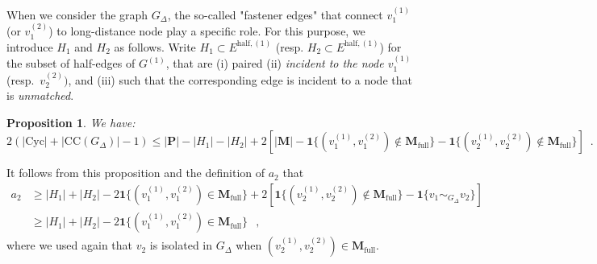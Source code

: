 \documentclass{article}
\newtheorem{proposition}{Proposition}
\begin{document}

\medskip 

When we consider the graph $G_{\Delta}$, the so-called "fastener edges" that connect $v_1^{(1)}$ (or $v_1^{(2)}$) to long-distance node play a specific role. For this purpose, we introduce $H_1$ and $H_2$ as follows.  
 Write $H_1\subset E^{\mathrm{half},(1)}$ (resp. $H_2\subset E^{\mathrm{half},(1)}$) for the subset of half-edges of $G^{(1)}$, that are (i) paired (ii) \emph{incident to the node $v_1^{(1)}$} (resp.~$v_2^{(2)})$,  and (iii) such that the corresponding edge is incident to a node that is \emph{unmatched}.




\begin{proposition}\label{prop2:template:chaine_rappeur}
    We have:
\[
    2(|\mathrm{Cyc}|+|\mathrm{CC}(G_{\Delta})| -1)\leq |\mathbf{P}| - |H_1| -  |H_2|
 + 2\left[|\mathbf{M}|-\mathbf{1}\{(v_1^{(1)},v_1^{(2)})\notin \mathbf{M}_{\mathrm{full}}\} -\mathbf{1}\{(v_2^{(1)},v_2^{(2)}) \notin \mathbf{M}_{\mathrm{full}}\}\right] \enspace . 
\]
\end{proposition}
It follows from this proposition and the definition of $a_2$ that 
\begin{align}\nonumber 
a_2 & \geq |H_1|+ |H_2| - 2\mathbf 1\{(v_1^{(1)},v_1^{(2)})\in \mathbf{M}_{\mathrm{full}}\}+ 2[\mathbf{1}\{(v_2^{(1)},v_2^{(2)}) \notin \mathbf{M}_{\mathrm{full}}\} -\mathbf{1}\{v_1 \sim_{G_\Delta} v_2\} ] \\ 
&\geq |H_1|+ |H_2| - 2\mathbf 1\{(v_1^{(1)},v_1^{(2)})\in \mathbf{M}_{\mathrm{full}}\}\enspace  \ , \label{eq:upper:a2}
\end{align}
where we used again that $v_2$ is isolated in $G_{\Delta}$ when $(v_2^{(1)},v_2^{(2)}) \in \mathbf{M}_{\mathrm{full}}$. 


\medskip 
\end{document}
